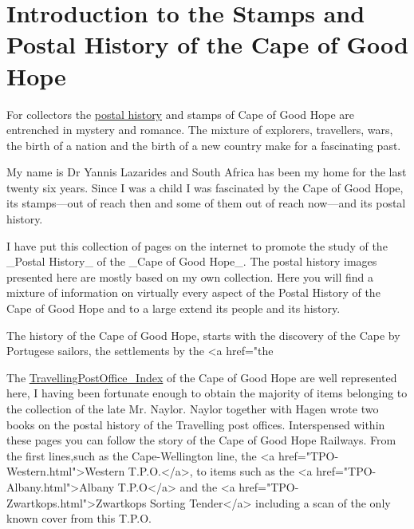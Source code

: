 
\chapter{Introduction to the Stamps and Postal History of the Cape of Good Hope
} 
For collectors  the \href{../general/postal_history}{postal history} and 
stamps of Cape of Good Hope are entrenched in mystery and romance. 
The mixture of explorers, travellers, wars, the birth of a nation and the birth of 
a new country make for a fascinating past. 

My name is Dr Yannis Lazarides and South Africa has been my home for the 
last twenty six years. Since I was a child I was fascinated by the Cape of Good Hope, 
its stamps---out of reach then and some of them out of reach now---and its postal history. 

I have put this collection of pages on the internet to promote the study of 
the _Postal History_  of the  _Cape of Good Hope_. 
The postal history images presented here are mostly based on my own collection. Here you will find a mixture of information on virtually every aspect of the Postal History of the Cape of Good Hope and to a large extend its people and its history. 

The history of the Cape of Good Hope, 
starts with the discovery of the Cape by Portugese sailors, the settlements by the <a href="the%


The \href{../cape-of-good-hope/TPO}{TravellingPostOffice_Index} of the Cape of Good Hope are well represented here,  I having been fortunate enough to obtain the majority of items belonging to the collection of 
the late Mr. Naylor. 
Naylor together with Hagen wrote two books on the postal history 
of the Travelling post offices. Interspensed within these pages 
you can follow the story of the Cape of Good Hope Railways. From the first 
lines,such as the Cape-Wellington line, the 
<a href="TPO-Western.html">Western T.P.O.</a>, to 
items such as the <a href="TPO-Albany.html">Albany T.P.O</a> and 
the <a href="TPO-Zwartkops.html">Zwartkops Sorting Tender</a> 
including a scan of the only known cover from this T.P.O.

